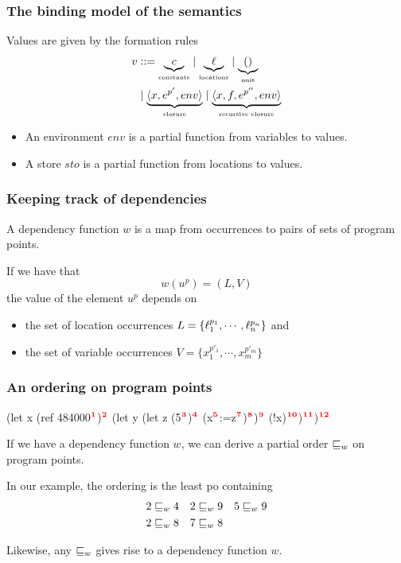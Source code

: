 \documentclass[aspectratio=169]{beamer}
\begin{document}
\begin{frame}
  \frametitle{The binding model of the semantics}

  Values are given by the formation rules
%
  \begin{align*}
    v & ::= \underbrace{c}_{\text{\tiny{constants}}} \mid \underbrace{\ell}_{\text{\tiny{locations}}} \mid
        \underbrace{()}_{\text{\tiny{unit}}} \\
    & \mid  \underbrace{\langle x,e^{p'},env\rangle}_{\text{\tiny{closure}}} \mid
      \underbrace{\langle x,f,e^{p''},env\rangle}_{\text{\tiny{recursive closure}}}
   \end{align*}

   \begin{itemize}
   \item An environment $env$ is a partial function from variables to values.
\item A store $sto$ is a partial function from locations to values.
   \end{itemize}

\end{frame}
\begin{frame} \frametitle{Keeping track of dependencies}

  A dependency function $w$ is a map from occurrences to pairs of sets
  of program points.
  
  If we have that
\[ w (u^p)=(L,V) \]
%
the value of the element $u^p$ depends on
\begin{itemize}
\item the set of location occurrences
  $L=\{\ell_1^{p_1},\cdots,\ell_n^{p_n}\}$ and
\item the set of variable occurrences $V =\{x_1^{p'_1},\cdots,x_m^{p'_m}\}$

\end{itemize}

\end{frame}

\begin{frame}[fragile]
  \frametitle{An ordering on program points}

   \begin{rescript}
   (let x (ref 484000$\mathbf{\textcolor{red}{^{1}}}$)$\mathbf{\textcolor{red}{^{2}}}$
     (let y (let z (5$\mathbf{\textcolor{red}{^{3}}}$)$\mathbf{\textcolor{red}{^{4}}}$
        (x$\mathbf{\textcolor{red}{^{5}}}$:=z$\mathbf{\textcolor{red}{^{7}}}$)$\mathbf{\textcolor{red}{^{8}}}$)$\mathbf{\textcolor{red}{^{9}}}$ (!x)$\mathbf{\textcolor{red}{^{10}}}$)$\mathbf{\textcolor{red}{^{11}}}$)$\mathbf{\textcolor{red}{^{12}}}$
\end{rescript}

      If we have a dependency function $w$, we can derive a partial order $\sqsubseteq_w$ on
      program points.

      In our example, the ordering is the least po containing
%
      \begin{align*}
        2 \sqsubseteq_w 4 && 2 \sqsubseteq_w 9 && 5 \sqsubseteq_w 9 \\
        2 \sqsubseteq_w 8 && 7 \sqsubseteq_w 8
      \end{align*}

      Likewise, any $\sqsubseteq_w$ gives rise to a dependency function $w$.
\end{frame}
\end{document}
